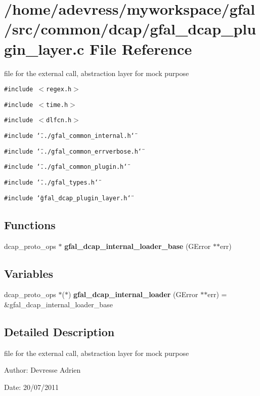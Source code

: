 \section{/home/adevress/myworkspace/gfal/src/common/dcap/gfal\_\-dcap\_\-plugin\_\-layer.c File Reference}
\label{gfal__dcap__plugin__layer_8c}
file for the external call, abstraction layer for mock purpose 

{\tt \#include $<$regex.h$>$}\par
{\tt \#include $<$time.h$>$}\par
{\tt \#include $<$dlfcn.h$>$}\par
{\tt \#include \char`\"{}../gfal\_\-common\_\-internal.h\char`\"{}}\par
{\tt \#include \char`\"{}../gfal\_\-common\_\-errverbose.h\char`\"{}}\par
{\tt \#include \char`\"{}../gfal\_\-common\_\-plugin.h\char`\"{}}\par
{\tt \#include \char`\"{}../gfal\_\-types.h\char`\"{}}\par
{\tt \#include \char`\"{}gfal\_\-dcap\_\-plugin\_\-layer.h\char`\"{}}\par
\subsection*{Functions}
\begin{CompactItemize}
\item 
dcap\_\-proto\_\-ops $\ast$ \textbf{gfal\_\-dcap\_\-internal\_\-loader\_\-base} (GError $\ast$$\ast$err)\label{gfal__dcap__plugin__layer_8c_611c0baecaaebfbde36bb483636b2d46}

\end{CompactItemize}
\subsection*{Variables}
\begin{CompactItemize}
\item 
dcap\_\-proto\_\-ops $\ast$($\ast$) \textbf{gfal\_\-dcap\_\-internal\_\-loader} (GError $\ast$$\ast$err) = \&gfal\_\-dcap\_\-internal\_\-loader\_\-base\label{gfal__dcap__plugin__layer_8c_613ae4b8bc8b68f6578a1451f436cc4f}

\end{CompactItemize}


\subsection{Detailed Description}
file for the external call, abstraction layer for mock purpose 

\begin{Desc}
\item[Author:]Devresse Adrien \end{Desc}
\begin{Desc}
\item[Date:]20/07/2011 \end{Desc}
